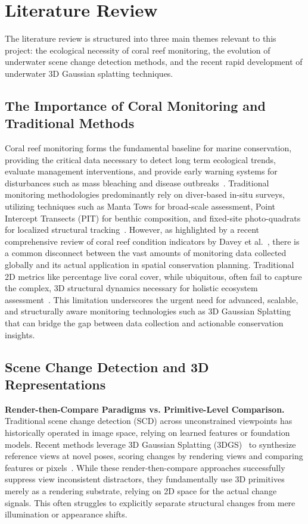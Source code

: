 \chapter{Literature Review}

The literature review is structured into three main themes relevant to this project: the ecological necessity of coral reef monitoring, the evolution of underwater scene change detection methods, and the recent rapid development of underwater 3D Gaussian splatting techniques.

\section{The Importance of Coral Monitoring and Traditional Methods}

Coral reef monitoring forms the fundamental baseline for marine conservation, providing the critical data necessary to detect long term ecological trends, evaluate management interventions, and provide early warning systems for disturbances such as mass bleaching and disease outbreaks~\cite{souter2020status}. Traditional monitoring methodologies predominantly rely on diver-based in-situ surveys, utilizing techniques such as Manta Tows for broad-scale assessment, Point Intercept Transects (PIT) for benthic composition, and fixed-site photo-quadrats for localized structural tracking~\cite{icri2021monitoring}. However, as highlighted by a recent comprehensive review of coral reef condition indicators by Davey et al.~\cite{davey2025review}, there is a common disconnect between the vast amounts of monitoring data collected globally and its actual application in spatial conservation planning. Traditional 2D metrics like percentage live coral cover, while ubiquitous, often fail to capture the complex, 3D structural dynamics necessary for holistic ecosystem assessment~\cite{davey2025review}. This limitation underscores the urgent need for advanced, scalable, and structurally aware monitoring technologies such as 3D Gaussian Splatting that can bridge the gap between data collection and actionable conservation insights.

\section{Scene Change Detection and 3D Representations}

\textbf{Render-then-Compare Paradigms vs. Primitive-Level Comparison.} 
Traditional scene change detection (SCD) across unconstrained viewpoints has historically operated in image space, relying on learned features or foundation models. Recent methods leverage 3D Gaussian Splatting (3DGS)~\cite{10897713} to synthesize reference views at novel poses, scoring changes by rendering views and comparing features or pixels~\cite{10.1145/3806262.3806264}. While these render-then-compare approaches successfully suppress  view inconsistent distractors, they fundamentally use 3D primitives merely as a rendering substrate, relying on 2D space for the actual change signals. This often struggles to explicitly separate structural changes from mere illumination or appearance shifts.

